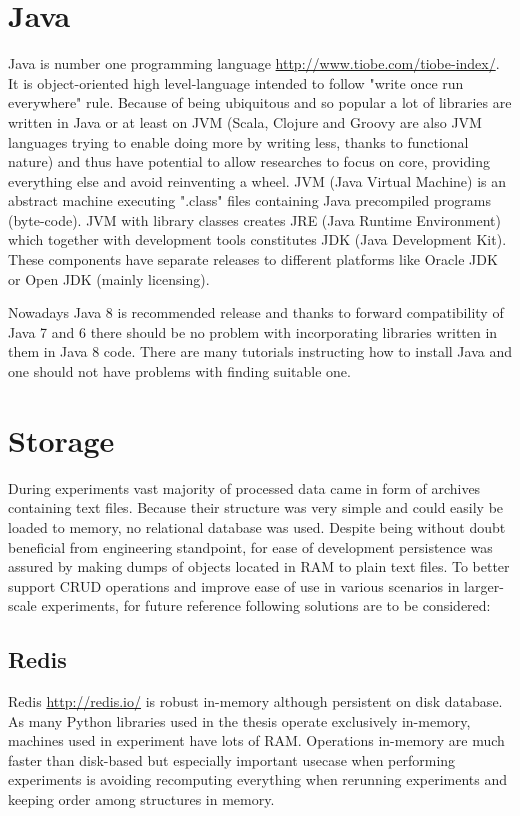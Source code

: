 \documentclass[a4paper, 12pt, oneside]{Thesis} %
\begin{document}
\section{Java} Java is number one programming language \url{http://www.tiobe.com/tiobe-index/}. It is object-oriented high level-language intended to follow "write once run everywhere" rule. Because of being ubiquitous and so popular a lot of libraries are written in Java or at least on JVM (Scala, Clojure and Groovy are also JVM languages trying to enable doing more by writing less, thanks to functional nature) and thus have potential to allow researches to focus on core, providing everything else and avoid reinventing a wheel. JVM (Java Virtual Machine) is an abstract machine executing ".class" files containing Java precompiled programs (byte-code). JVM with library classes creates JRE (Java Runtime Environment) which together with development tools constitutes JDK (Java Development Kit). These components have separate releases to different platforms like Oracle JDK or Open JDK (mainly licensing). 

Nowadays Java 8 is recommended release and thanks to forward compatibility of Java 7 and 6 there should be no problem with incorporating libraries written in them in Java 8 code. There are many tutorials instructing how to install Java and one should not have problems with finding suitable one.

\section{Storage} During experiments vast majority of processed data came in form of archives containing text files. Because their structure was very simple and could easily be loaded to memory, no relational database was used. Despite being without doubt beneficial from engineering standpoint, for ease of development persistence was assured by making dumps of objects located in RAM to plain text files. To better support CRUD operations and improve ease of use in various scenarios in larger-scale experiments, for future reference following solutions are to be considered:

\subsection{Redis} Redis \url{http://redis.io/} is robust in-memory although persistent on disk database. As many Python libraries used in the thesis operate exclusively in-memory, machines used in experiment have lots of RAM. Operations in-memory are much faster than disk-based but especially important usecase when performing experiments is avoiding recomputing everything when rerunning experiments and keeping order among structures in memory.
\end{document}
